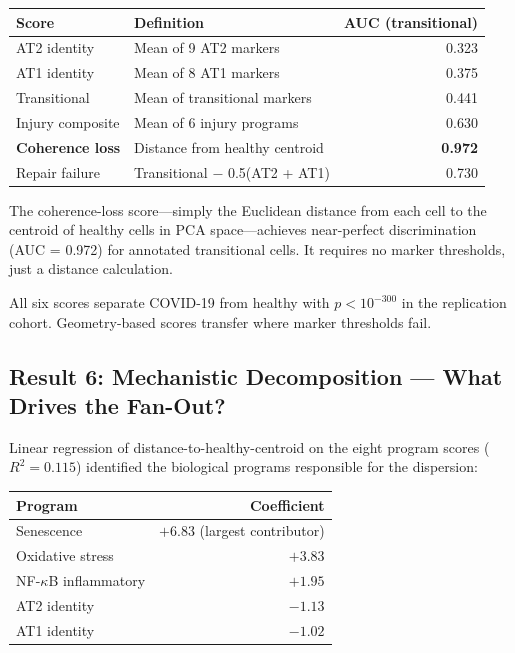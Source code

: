 \documentclass[11pt]{article}
\begin{document}
\begin{center}
\small
\begin{tabular}{llr}
\toprule
Score & Definition & AUC (transitional) \\
\midrule
AT2 identity & Mean of 9 AT2 markers & 0.323 \\
AT1 identity & Mean of 8 AT1 markers & 0.375 \\
Transitional & Mean of transitional markers & 0.441 \\
Injury composite & Mean of 6 injury programs & 0.630 \\
\textbf{Coherence loss} & Distance from healthy centroid & \textbf{0.972} \\
Repair failure & Transitional $-$ 0.5(AT2 + AT1) & 0.730 \\
\bottomrule
\end{tabular}
\end{center}

The coherence-loss score---simply the Euclidean distance from each cell to the centroid of healthy cells in PCA space---achieves near-perfect discrimination (AUC = 0.972) for annotated transitional cells. It requires no marker thresholds, just a distance calculation.

All six scores separate COVID-19 from healthy with $p < 10^{-300}$ in the replication cohort. Geometry-based scores transfer where marker thresholds fail.

\subsection{Result 6: Mechanistic Decomposition --- What Drives the Fan-Out?}

Linear regression of distance-to-healthy-centroid on the eight program scores ($R^2 = 0.115$) identified the biological programs responsible for the dispersion:

\begin{center}
\small
\begin{tabular}{lr}
\toprule
Program & Coefficient \\
\midrule
Senescence & $+6.83$ (largest contributor) \\
Oxidative stress & $+3.83$ \\
NF-$\kappa$B inflammatory & $+1.95$ \\
AT2 identity & $-1.13$ \\
AT1 identity & $-1.02$ \\
\bottomrule
\end{tabular}
\end{center}
\end{document}
